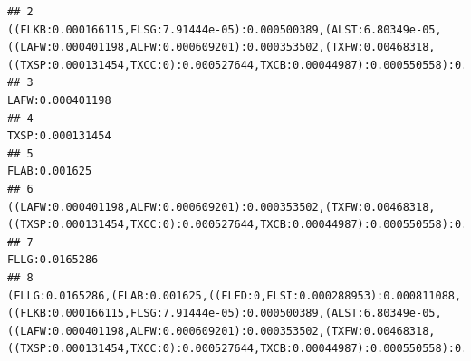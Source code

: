 \documentclass[]{article}
\begin{document}
\begin{verbatim}
## 2                                                                                                                                                                         ((FLKB:0.000166115,FLSG:7.91444e-05):0.000500389,(ALST:6.80349e-05,((LAFW:0.000401198,ALFW:0.000609201):0.000353502,(TXFW:0.00468318,((TXSP:0.000131454,TXCC:0):0.000527644,TXCB:0.00044987):0.000550558):0.00263375):0.000535248):0.0026018):0.000242145
## 3                                                                                                                                                                                                                                                                                                                                                                                                                  LAFW:0.000401198
## 4                                                                                                                                                                                                                                                                                                                                                                                                                  TXSP:0.000131454
## 5                                                                                                                                                                                                                                                                                                                                                                                                                     FLAB:0.001625
## 6                                                                                                                                                                                                                                                                    ((LAFW:0.000401198,ALFW:0.000609201):0.000353502,(TXFW:0.00468318,((TXSP:0.000131454,TXCC:0):0.000527644,TXCB:0.00044987):0.000550558):0.00263375):0.000535248
## 7                                                                                                                                                                                                                                                                                                                                                                                                                    FLLG:0.0165286
## 8                                                               (FLLG:0.0165286,(FLAB:0.001625,((FLFD:0,FLSI:0.000288953):0.000811088,((FLKB:0.000166115,FLSG:7.91444e-05):0.000500389,(ALST:6.80349e-05,((LAFW:0.000401198,ALFW:0.000609201):0.000353502,(TXFW:0.00468318,((TXSP:0.000131454,TXCC:0):0.000527644,TXCB:0.00044987):0.000550558):0.00263375):0.000535248):0.0026018):0.000242145):0.00153256):0.00951218):0.00146329

\end{verbatim}
\end{document}
